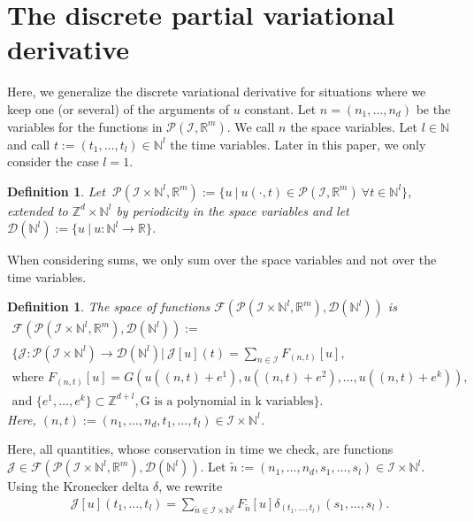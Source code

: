 \documentclass[manuscript]{acmart}
\newcommand{\Rr}{{\mathbb{R}}}
\newcommand{\Nn}{{\mathbb{N}}}
\newcommand{\Zz}{{\mathbb{Z}}}
\newcommand{\1}{{\chi}}
\newcommand{\Ii}{{\mathcal{I}}}
\numberwithin{equation}{section}
\theoremstyle{thmlemcorr}
\numberwithin{theorem}{section}
\theoremstyle{thmlemcorr*}
\theoremstyle{defi}
\newtheorem{definition}[theorem]{Definition}
\theoremstyle{remexample}
\theoremstyle{ass}
\begin{document}
\section{The discrete partial variational derivative}
\label{pvard}
Here, we generalize the discrete variational derivative for situations where we keep one (or several) of the arguments of $u$ constant.
Let $n=(n_1,\ldots,n_d)$ be the variables for the functions in $\mathcal{P}(\Ii,\Rr^m)$. We call $n$ the space variables. Let $l\in\Nn$ and call $t:=(t_1,\ldots,t_l)\in\Nn^l$ the time variables. Later in this paper, we only consider the case $l=1$.
\begin{definition}
	Let $\ \mathcal{P}(\Ii\times\Nn^l,\Rr^m):=\{u\ |\ u(\cdot,t)\in\mathcal{P}(\Ii,\Rr^m)\ \forall t\in\Nn^l \}$, extended to $\Zz^d\times\Nn^l$ by periodicity in the space variables and let $\mathcal{D}(\Nn^l):=\{u\ |\ u:\Nn^l\rightarrow\Rr\}$.
\end{definition}
When considering sums, we only sum over the space variables and not over the time variables.
\begin{definition}
	\label{quantityfunc2}
	The space of functions $\mathcal{F}(\mathcal{P}(\Ii\times\Nn^l,\Rr^m),\mathcal{D}(\Nn^l))$ is
	\begin{gather*}
		\mathcal{F}(\mathcal{P}(\Ii\times\Nn^l,\Rr^m),\mathcal{D}(\Nn^l)):=\\	
		\Bigg\{\mathcal{J}:\mathcal{P}(\Ii\times\Nn^l)\rightarrow\mathcal{D}(\Nn^l) \Bigg|\ \mathcal{J}[u](t)=\sum_{n\in\Ii}F_{(n,t)}[u],\\
		\text{where } F_{(n,t)}[u]=G(u((n,t)+e^1),u((n,t)+e^2),\ldots,u((n,t)+e^k)),\\
		\text{and }
		\{e^1,\ldots,e^k\}\subset\Zz^{d+l},\text{G is a polynomial in k variables}\Bigg\}.
	\end{gather*}
Here, $(n,t):=(n_1,\ldots,n_d,t_1,\ldots,t_l)\in\Ii\times\Nn^l$.
\end{definition}
Here, all quantities, whose conservation in time we check, are functions $\mathcal{J}\in\mathcal{F}(\mathcal{P}(\Ii\times\Nn^l,\Rr^m),\mathcal{D}(\Nn^l))$. %
Let $\tilde{n}:=(n_1,\dots,n_d,s_1,\dots,s_l)\in\Ii\times\Nn^l$. Using the Kronecker delta $\delta$, we rewrite
\begin{gather*}
	\mathcal{J}[u](t_1,\ldots,t_{l})
	=\sum_{\tilde{n}\in\Ii\times\Nn^l}F_{\tilde{n}}[u]\delta_{(t_1,\ldots,t_{l})}(s_1,\ldots,s_l).
\end{gather*}
\end{document}
